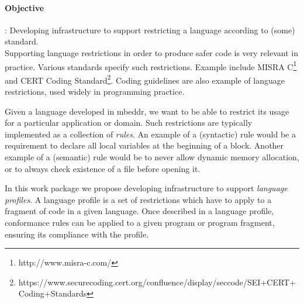 \paragraph{\textbf{Objective}}: Developing infrastructure to support
restricting a language according to (some) standard.\vspace{.2cm}\\
Supporting language restrictions in order to produce safer code is very relevant
in practice. Various standards specify such restrictions.
Example include MISRA C\footnote{http://www.misra-c.com/} and CERT Coding
Standard\footnote{https://www.securecoding.cert.org/confluence/display/seccode/SEI+CERT+Coding+Standards}.
Coding guidelines are also example of language restrictions, used widely 
in programming practice.

Given a language developed in mbeddr, we want to be able to restrict its usage
for a particular application or domain. Such restrictions are typically
implemented as a collection of \emph{rules}.
An example of a (syntactic) rule would be a requirement to declare all local
variables at the beginning of a block. Another example of a (semantic) rule
would be to never allow dynamic memory allocation, or to always check existence
of a file before opening it.

In this work package we propose developing infrastructure to support
\emph{language profiles}. A language profile is a
set of restrictions which have to apply to a fragment of code
in a given language. Once described in a language profile, conformance rules
can be applied to a given program or program fragment, ensuring its
compliance with the profile.



  
